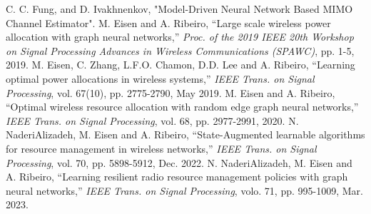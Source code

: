 \documentclass[journal,12pt,onecolumn,draftclsnofoot]{IEEEtran}
\begin{document}
    \begin{thebibliography}{1}
        C. C. Fung, and D. Ivakhnenkov, "Model-Driven Neural Network Based MIMO Channel Estimator".
        M. Eisen and A. Ribeiro, ``Large scale wireless power allocation with graph neural networks,'' \emph{Proc. of the 2019 IEEE 20th Workshop on Signal Processing Advances in Wireless Communications (SPAWC)}, pp. 1-5, 2019.
        M. Eisen, C. Zhang, L.F.O. Chamon, D.D. Lee and A. Ribeiro, ``Learning optimal power allocations in wireless systems,'' \emph{IEEE Trans. on Signal Processing}, vol. 67(10), pp. 2775-2790, May 2019.
        M. Eisen and A. Ribeiro, ``Optimal wireless resource allocation with random edge graph neural networks,'' \emph{IEEE Trans. on Signal Processing}, vol. 68, pp. 2977-2991, 2020.
        N. NaderiAlizadeh, M. Eisen and A. Ribeiro, ``State-Augmented learnable algorithms for resource management in wireless networks,'' \emph{IEEE Trans. on Signal Processing}, vol. 70, pp. 5898-5912, Dec. 2022.
        N. NaderiAlizadeh, M. Eisen and A. Ribeiro, ``Learning resilient radio resource management policies with graph neural networks,'' \emph{IEEE Trans. on Signal Processing}, volo. 71, pp. 995-1009, Mar. 2023.
    \end{thebibliography}
\end{document}

